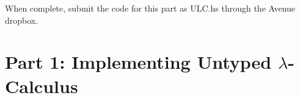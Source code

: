 \documentclass{exam}
\begin{document}
\begin{center}
\end{center}

When complete, submit the code for this part as ULC.hs through the Avenue dropbox.

\section*{Part 1: Implementing Untyped $\lambda$-Calculus}
\end{document}
